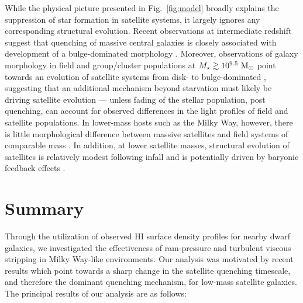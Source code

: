 \documentclass[usenatbib]{mn2e}
\newcommand{\mstar}{{M}_{\star}}
\newcommand{\msun}{{\rm M}_{\odot}}
\begin{document}
While the physical picture presented in Fig.~\ref{fig:model} broadly
explains the suppression of star formation in satellite systems, it
largely ignores any corresponding structural evolution. 
%
Recent observations at intermediate redshift suggest that quenching of
massive central galaxies is closely associated with development of a
bulge-dominated morphology \citep{bell12, cheung12}.
%
Moreover, observations of galaxy morphology in field and group/cluster
populations at $\mstar \gtrsim 10^{9.5}~\msun$ point towards an
evolution of satellite systems from disk- to bulge-dominated
\citep{vdb08, weinmann09}, suggesting that an additional mechanism
beyond starvation must likely be driving satellite evolution ---
unless fading of the stellar population, post quenching, can account
for observed differences in the light profiles of field and satellite
populations. 
%
In lower-mass hosts such as the Milky Way, however, there is little
morphological difference between massive satellites and field systems
of comparable mass \citep{phillips14}.
%
In addition, at lower satellite masses, structural evolution of
satellites is relatively modest following infall and is potentially
driven by baryonic feedback effects \citep{sj16, wheeler16}.






\section{Summary}
\label{sec:endgame}

Through the utilization of observed H{\scriptsize I} surface density
profiles for nearby dwarf galaxies, we investigated the effectiveness
of ram-pressure and turbulent viscous stripping in Milky Way-like
environments. 
%
Our analysis was motivated by recent results which point towards a
sharp change in the satellite quenching timescale, and therefore the
dominant quenching mechanism, for low-mass satellite galaxies. The
principal results of our analysis are as follows:
\end{document}
